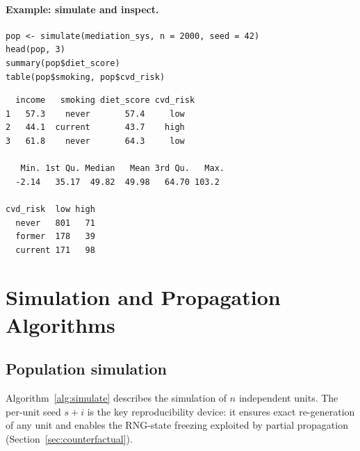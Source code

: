 \documentclass[article]{jss}
\begin{document}
\paragraph{Example: simulate and inspect.}

\begin{tcolorbox}[codebox, title={\small\textbf{R} code}]
\begin{verbatim}
pop <- simulate(mediation_sys, n = 2000, seed = 42)
head(pop, 3)
summary(pop$diet_score)
table(pop$smoking, pop$cvd_risk)
\end{verbatim}
\end{tcolorbox}

\begin{tcolorbox}[outputbox, title={\small Output}]
\begin{verbatim}
  income   smoking diet_score cvd_risk
1   57.3    never       57.4     low
2   44.1  current       43.7    high
3   61.8    never       64.3     low

   Min. 1st Qu. Median   Mean 3rd Qu.   Max.
  -2.14   35.17  49.82  49.98   64.70 103.2

cvd_risk  low high
  never   801   71
  former  178   39
  current 171   98
\end{verbatim}
\end{tcolorbox}

\section{Simulation and Propagation Algorithms}
\label{sec:simulation}

\subsection{Population simulation}
\label{sec:pop_alg}

Algorithm~\ref{alg:simulate} describes the simulation of $n$ independent units.
The per-unit seed $s + i$ is the key reproducibility device: it ensures exact
re-generation of any unit and enables the RNG-state freezing exploited by partial
propagation (Section~\ref{sec:counterfactual}).
\end{document}
